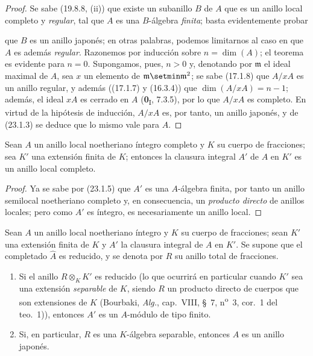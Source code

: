 \begin{proof}
Se sabe (19.8.8, (ii)) que existe un subanillo $B$ de $A$ que es un
anillo local completo y \emph{regular}, tal que $A$ es una $B$-álgebra \emph{finita}; basta
evidentemente probar


que $B$ es un anillo japonés; en otras palabras, podemos limitarnos al caso en que
$A$ es además \emph{regular}. Razonemos por inducción sobre
$n=\dim(A)$; el teorema es evidente para $n=0$. Supongamos, pues, $n>0$ y,
denotando por $\mathfrak m$ el ideal maximal de $A$, sea $x$ un elemento de
$\mathfrak m\setmin\mathfrak m^2$; se sabe (17.1.8) que $A/xA$ es un anillo
regular, y además ((17.1.7) y (16.3.4)) que
$\dim(A/xA)=n-1$; además, el ideal $xA$ es cerrado en $A$
(\textbf{0}\textsubscript{I}, 7.3.5), por lo que $A/xA$ es completo. En virtud de la hipótesis
de inducción, $A/xA$ es, por tanto, un anillo japonés, y de
(23.1.3) se deduce que lo mismo vale para $A$.
\end{proof}

\begin{corollary}[23.1.6]
\label{0.23.1.6-es}
Sean $A$ un anillo local noetheriano íntegro completo y $K$ su cuerpo de
fracciones; sea $K'$ una extensión finita de $K$; entonces la clausura integral
$A'$ de $A$ en $K'$ es un anillo local completo.
\end{corollary}

\begin{proof}
Ya se sabe por (23.1.5) que $A'$ es una $A$-álgebra finita, por tanto un anillo
semilocal noetheriano completo y, en consecuencia, un \emph{producto directo}
de anillos locales; pero como $A'$ es íntegro, es necesariamente un
anillo local.
\end{proof}

\begin{proposition}[23.1.7]
\label{0.23.1.7-es}
Sean $A$ un anillo local noetheriano íntegro y $K$ su cuerpo de fracciones;
sean $K'$ una extensión finita de $K$ y $A'$ la clausura integral de $A$ en
$K'$. Se supone que el completado $\widehat A$ es \textup{reducido}, y se denota por
$R$ su anillo total de fracciones.
\begin{enumerate}
  \item[\textup{(i)}] Si el anillo $R\otimes_KK'$ es reducido \textup{(lo que ocurrirá en
  particular cuando $K'$ sea una extensión \emph{separable} de $K$, siendo $R$ un
  producto directo de cuerpos que son extensiones de $K$ (Bourbaki, \emph{Alg.},
  cap.~VIII, §~7, n\textsuperscript{o}~3, cor.~1 del teo.~1))}, entonces $A'$ es
  un $A$-módulo de tipo finito.
  \item[\textup{(ii)}] Si, en particular, $R$ es una $K$-álgebra separable, entonces $A$
  es un anillo japonés.
\end{enumerate}
\end{proposition}

